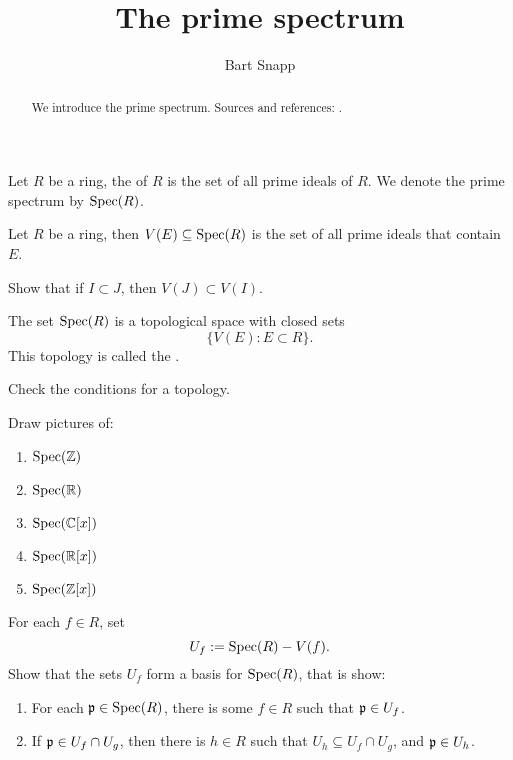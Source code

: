 \documentclass{ximera}
\author{Bart Snapp}
\title{The prime spectrum}
\begin{document}
\begin{abstract}
  We introduce the prime spectrum. Sources and references:
  \cite{AM1969}.
\end{abstract}
\maketitle



\begin{definition}
  Let $R$ be a ring, the  of $R$ is the set of all
  prime ideals of $R$. We denote the prime spectrum by $\operatorname{Spec}(R)$.
\end{definition}

\begin{definition}
  Let $R$ be a ring, then $V(E)\subseteq \operatorname{Spec}(R)$ is the set of all
  prime ideals that contain $E$.
\end{definition}

\begin{exercise}
  Show that if $I\subset J$, then $V(J) \subset V(I)$.
\end{exercise}

\begin{proposition}
  The set $\operatorname{Spec}(R)$ is a topological space with closed sets
  \[
  \{ V(E):E\subset R\}.
  \]
  This topology is called the .
  \begin{sketch}
    Check the conditions for a topology.
  \end{sketch}
\end{proposition}

\begin{exercise}%
  Draw pictures of:
  \begin{enumerate}
  \item $\operatorname{Spec}(\mathbb Z)$
  \item $\operatorname{Spec}(\mathbb R)$
  \item $\operatorname{Spec}(\mathbb C[x])$
  \item $\operatorname{Spec}(\mathbb R[x])$
  \item $\operatorname{Spec}(\mathbb Z[x])$
  \end{enumerate}
\end{exercise}


\begin{exercise}
  For each $f\in R$, set
  \[
  U_f := \operatorname{Spec}(R) - V(f).
  \]
  Show that the sets $U_f$ form a basis for $\operatorname{Spec}(R)$, that is show:
  \begin{enumerate}
    \item For each $\mathfrak{p}\in\operatorname{Spec}(R)$, there is some $f\in R$ such that
      $\mathfrak{p}\in U_f$.
    \item If $\mathfrak{p}\in U_f \cap U_g$, then there is $h\in R$ such that
      $U_h\subseteq U_f\cap U_g$, and $\mathfrak{p}\in U_h$.
  \end{enumerate}
\end{exercise}
\end{document}
